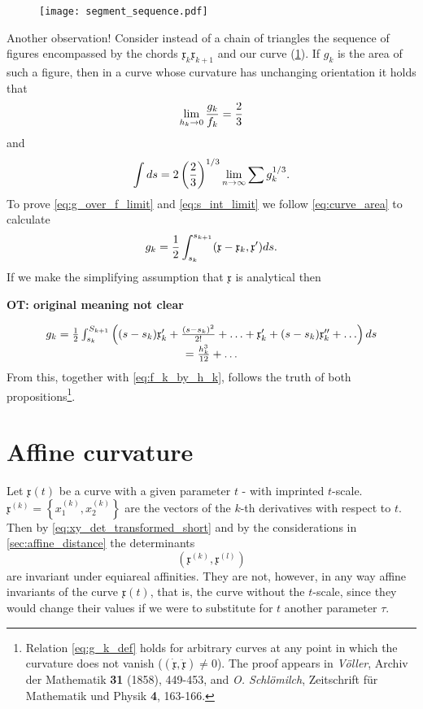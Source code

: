 \documentclass[11pt]{book} \usepackage{amssymb}
\newcommand{\myvec}[1]{\mathfrak{#1}}
\newcommand{\vecderiv}[1]{\dot{\myvec{#1}}}
\newcommand{\vecderivv}[1]{\ddot{\myvec{#1}}}
\begin{document}
\begin{figure}[htp]
  \centering
  \texttt{[image: segment\_sequence.pdf]}
  \caption{}
  \label{fig:segment_sequence}
\end{figure}

Another observation! Consider instead of a chain of triangles the
sequence of figures encompassed by the chords $\myvec{x}_k\myvec{x}_{k+1}$ and
our curve (\ref{fig:segment_sequence}). If $g_k$ is the area of such a figure,
then in a curve whose curvature has unchanging orientation it holds that
\begin{equation}
  \label{eq:g_over_f_limit}
  \lim_{h_k\to 0}{g_k\over f_k}={2\over 3}
\end{equation}
and
\begin{equation}
  \label{eq:s_int_limit}
  \int ds=2\left({2\over 3}\right)^{1/3}\lim_{n\to\infty}\sum g_k^{1/3}.
\end{equation}
To prove \eqref{eq:g_over_f_limit} and \eqref{eq:s_int_limit} we follow
\eqref{eq:curve_area} to calculate
\begin{equation}
  \label{eq:g_k_def}
  g_k={1\over 2}\int_{s_k}^{s_{k+1}}(\myvec{x}-\myvec{x}_k,\myvec{x}')ds.
\end{equation}
 If we make the simplifying assumption that $\myvec{x}$ is analytical then
 
 {\bf OT: original meaning not clear}
 
 \begin{equation}
   \begin{array}{c}
     g_k={1\over 2}\int_{s_k}^{S_{k+1}}
     \left(
       (s-s_k)\myvec{x}_k'+{(s-s_k)^2\over 2!}+\ldots+\myvec{x}_k'+(s-s_k)\myvec{x}_k''+\ldots
     \right)ds
     \\
     ={h_k^3\over 12}+\ldots
   \end{array}
 \end{equation}
 From this, together with \eqref{eq:f_k_by_h_k}, follows the truth of
both propositions\footnote{Relation \eqref{eq:g_k_def} holds for arbitrary
curves at any point in which the curvature does not vanish 
($(\vecderiv{x},\vecderivv{x})\neq 0$). The proof appears in {\em V\"oller},
Archiv der Mathematik {\bf 31} (1858), 449-453, and {\em O. Schl\"omilch}, 
Zeitschrift f\"ur Mathematik und Physik {\bf 4}, 163-166.}.

\section{Affine curvature}
Let $\myvec{x}(t)$ be a curve with a given parameter $t$ - with imprinted 
$t$-scale. $\myvec{x}^{(k)}=\left\{x_1^{(k)},x_2^{(k)}\right\}$ are the vectors
of the $k$-th derivatives with respect to $t$. Then by 
\eqref{eq:xy_det_transformed_short} and by the considerations in 
\ref{sec:affine_distance} the determinants
\begin{equation}
  \label{eq:derive_det}
  (\myvec{x}^{(k)}, \myvec{x}^{(l)})
\end{equation}
are invariant under equiareal affinities. They are not, however, in any way
affine invariants of the curve $\myvec{x}(t)$, that is, the curve without 
the $t$-scale, since they would change their values if we were to substitute
for $t$ another parameter $\tau$.
\end{document}
